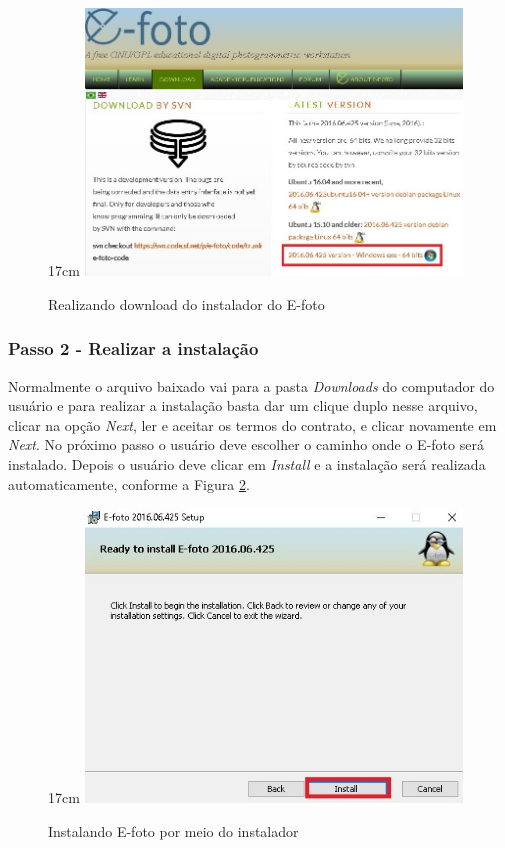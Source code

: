 \begin{figure}[!ht]{17cm}
	\centering
	\includegraphics[width=10cm]{Figuras/downmsi.jpg} 
	\caption{Realizando download do instalador do E-foto} \label{fig:downmsi}
\end{figure}

\subsubsection{Passo 2 - Realizar a instalação}
Normalmente o arquivo baixado vai para a pasta \textit{Downloads} do computador do usuário e para realizar a instalação basta dar um clique duplo nesse arquivo, clicar na opção \textit{Next}, ler e aceitar os termos do contrato, e clicar novamente em \textit{Next}.  No próximo passo o usuário deve escolher o caminho onde o E-foto será instalado. Depois o usuário deve clicar em \textit{Install} e a instalação será realizada automaticamente, conforme a Figura \ref{fig:installmsi}.
 
\begin{figure}[!ht]{17cm}
   \centering
   \includegraphics[width=10cm]{Figuras/installmsi.jpg}
   \caption{Instalando E-foto por meio do instalador} \label{fig:installmsi}
\end{figure}
  

